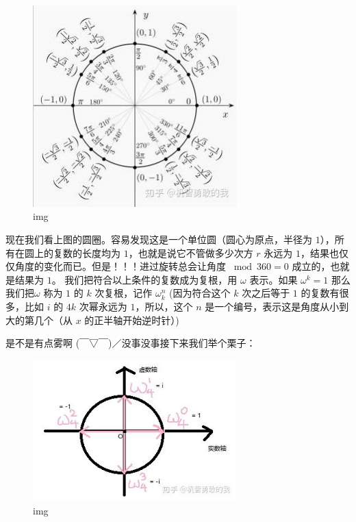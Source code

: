 \begin{figure}[htbp]
\centering
\includegraphics[width=0.7\textwidth]{docs/math/images/fft2.jpg} 
\caption{img}
\end{figure}

现在我们看上图的圆圈。容易发现这是一个单位圆（圆心为原点，半径为 $1$），所有在圆上的复数的长度均为 $1$，也就是说它不管做多少次方 $r$ 永远为 $1$，结果也仅仅角度的变化而已。但是！！！进过旋转总会让角度 $\bmod 360 = 0$ 成立的，也就是结果为 $1$。 我们把符合以上条件的复数成为复根，用 $\omega$ 表示。如果 $\omega^k=1$ 那么我们把$\omega$ 称为 $1$ 的 $k$ 次复根，记作 $\omega_k^n$ (因为符合这个 $k$ 次之后等于 $1$ 的复数有很多，比如 $i$ 的 $4k$ 次幂永远为 $1$，所以，这个 $n$ 是一个编号，表示这是角度从小到大的第几个（从 $x$ 的正半轴开始逆时针）)

是不是有点雾啊 (￣▽￣)／没事没事接下来我们举个栗子：

\begin{figure}[htbp]
\centering
\includegraphics[width=0.7\textwidth]{docs/math/images/fft3.jpg} 
\caption{img}
\end{figure}

